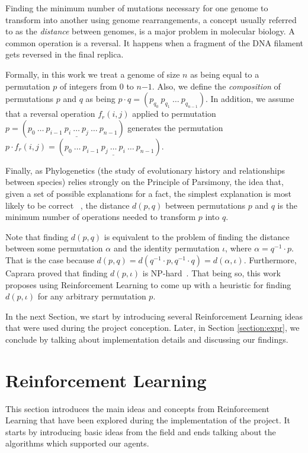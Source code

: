 \documentclass[11pt,twoside]{article}
\begin{document}
Finding the minimum number of mutations necessary for one genome to transform into another using genome rearrangements, a concept usually referred to as the \textit{distance} between genomes, is a major problem in molecular biology. A common operation is a reversal. It happens when a fragment of the DNA filament gets reversed in the final replica. 

Formally, in this work we treat a genome of size $n$ as being equal to a permutation $p$ of integers from $0$ to $n{-1}$. Also, we define the \textit{composition} of permutations $p$ and $q$ as being $p \cdot q = (p_{q_0}\ p_{q_1}\ \ldots\ p_{q_{n-1}})$. In addition, we assume that a reversal operation $f_r(i,j)$ applied to permutation $p = (p_0\ \ldots\ p_{i-1}\ \underline{p_{i}\ \ldots\ p_{j}}\ \ldots\ p_{n-1})$ generates the permutation $p \cdot f_r(i,j) = (p_0\ \ldots\ p_{i-1}\ \underline{p_{j}\ \ldots\ p_{i}}\ \ldots\ p_{n-1})$.

Finally, as Phylogenetics (the study of evolutionary history and relationships between species) relies strongly on the Principle of Parsimony, the idea that, given a set of possible explanations for a fact, the simplest explanation is most likely to be correct ~\cite{parsimony}, the distance $d(p, q)$ between permutations $p$ and $q$ is the minimum number of operations needed to transform $p$ into $q$. 

Note that finding $d(p, q)$ is equivalent to the problem of finding the distance between some permutation $\alpha$ and the identity permutation $\iota$, where $\alpha = q^{-1} \cdot p$. That is the case because $d(p, q) = d(q^{-1} \cdot p, q^{-1} \cdot q) = d(\alpha, \iota)$. Furthermore, Caprara proved that finding $d(p, \iota)$ is NP-hard~\cite{caprara1999sorting}. That being so, this work proposes using Reinforcement Learning to come up with a heuristic for finding $d(p, \iota)$ for any arbitrary permutation $p$.

In the next Section, we start by introducing several Reinforcement Learning ideas that were used during the project conception. Later, in Section \ref{section:expr}, we conclude by talking about implementation details and discussing our findings.

\section{Reinforcement Learning}

This section introduces the main ideas and concepts from Reinforcement Learning that have been explored during the implementation of the project. It starts by introducing basic ideas from the field and ends talking about the algorithms which supported our agents.
\end{document}
